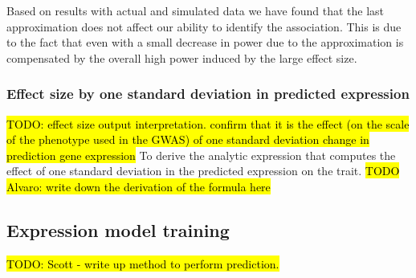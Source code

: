 \documentclass[10pt]{article}
\begin{document}


Based on results with actual and simulated data we have found that the last approximation does not affect our ability to identify the association. This is due to the fact that even with a small decrease in power due to the approximation is compensated by the overall high power induced by the large effect size.

\subsubsection*{Effect size by one standard deviation in predicted expression}
\hl{TODO: effect size output interpretation. confirm that it is the effect (on the scale of the phenotype used in the GWAS) of one standard deviation change in prediction gene expression}
To derive the analytic expression that computes the effect of one standard deviation in the predicted expression on the trait. \hl{TODO Alvaro: write down the derivation of the formula here}

\subsection*{Expression model training}

\hl{TODO: Scott - write up method to perform prediction.}
\end{document}
